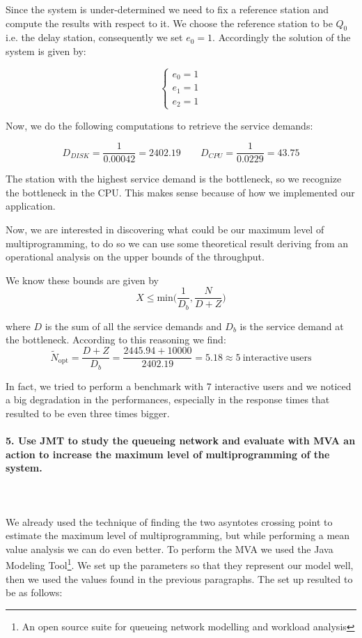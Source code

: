 \documentclass[11pt]{scrartcl} %
\begin{document}
Since the system is under-determined we need to fix a reference station and compute the  results with respect to it. We choose the reference station to  be $Q_0$ i.e. the  delay station, consequently we set $e_0 = 1$. Accordingly the solution of the system is given by:

$$\begin{cases} e_0=1\\ e_1=1\\ e_2=1\end{cases}$$

Now, we do the following  computations to retrieve the service demands:

$$D_{DISK}=\dfrac{1}{0.00042}=2402.19\qquad D_{CPU}=\dfrac{1}{0.0229}=43.75$$

The station with the highest service demand is the bottleneck, so we recognize the bottleneck in the CPU. This makes sense because of how we implemented our application.


Now, we are interested in discovering what could be our maximum level of multiprogramming, to do so we can use some theoretical result deriving from an operational  analysis on the upper bounds of the throughput.


We know these bounds are given by $$X\leq \mathrm{min}\bigg(\dfrac{1}{D_b}, \dfrac{N}{D+Z}\bigg)$$

where $D$ is the sum of all the service demands and $D_b$ is the service demand at the bottleneck. According to this reasoning we find: $$\widetilde{N}_{\mathrm{opt}}=\dfrac{D+Z}{D_b}=\dfrac{2445.94+10000}{2402.19}=5.18\approx 5\ \mathrm{interactive\ users}$$

In fact, we tried to perform a benchmark with 7 interactive users and we noticed a big degradation in the performances, especially in the response times that resulted to be even three times bigger.


\paragraph*{5. Use JMT to study the queueing network and evaluate with MVA an action to increase the maximum level of multiprogramming of the system.} \mbox{}\\\\

We already used the technique of finding the two asyntotes crossing point to estimate the maximum level of multiprogramming, but while performing a mean value analysis we can do even better. To perform the MVA  we used the Java Modeling Tool\footnote{An open source suite for queueing network modelling and workload analysis}. We set up the parameters so that they represent our model well, then we used the values found in the previous paragraphs. The set up resulted to be as follows:
\end{document}
